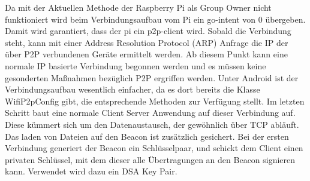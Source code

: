 Da mit der Aktuellen Methode der Raspberry Pi als Group Owner nicht funktioniert wird beim Verbindungsaufbau vom Pi ein go-intent von 0 übergeben. Damit wird garantiert, dass der pi ein p2p-client wird. Sobald die Verbindung steht, kann mit einer Address Resolution Protocol (ARP) Anfrage die IP der über P2P verbundenen Geräte ermittelt werden. Ab diesem Punkt kann eine normale IP basierte Verbindung begonnen werden und es müssen keine gesonderten Maßnahmen bezüglich P2P ergriffen werden. Unter Android ist der Verbindungsaufbau wesentlich einfacher, da es dort bereits die Klasse WifiP2pConfig gibt, die entsprechende Methoden zur Verfügung stellt.
Im letzten Schritt baut eine normale Client Server Anwendung auf dieser Verbindung auf. Diese kümmert sich um den Datenaustausch, der gewöhnlich über TCP abläuft. Das laden von Dateien auf den Beacon ist zusätzlich gesichert. Bei der ersten Verbindung generiert der Beacon ein Schlüsselpaar, und schickt dem Client einen privaten Schlüssel, mit dem dieser alle Übertragungen an den Beacon signieren kann. Verwendet wird dazu ein DSA Key Pair.